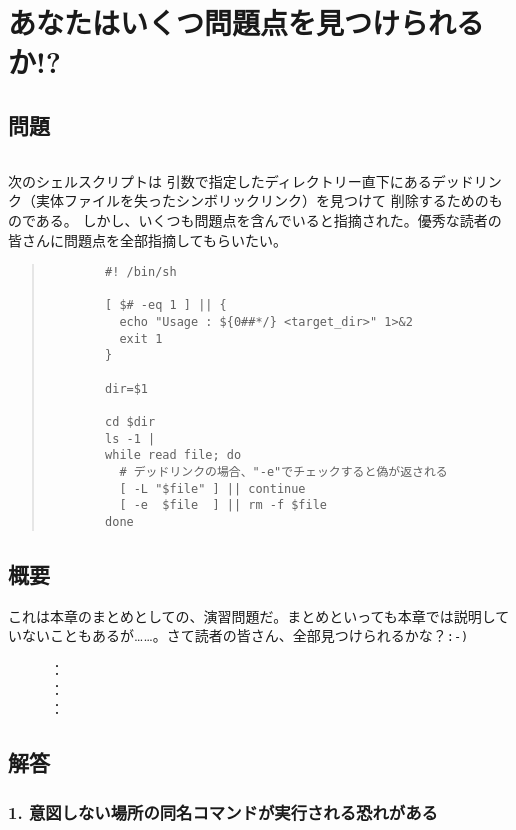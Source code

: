 \section{あなたはいくつ問題点を見つけられるか!?}

\subsection*{問題}
\noindent
$\!\!\!\!\!$
\begin{grshfboxit}{160.0mm}
	次のシェルスクリプトは
	引数で指定したディレクトリー直下にあるデッドリンク（実体ファイルを失ったシンボリックリンク）を見つけて
	削除するためのものである。
	しかし、いくつも問題点を含んでいると指摘された。優秀な読者の皆さんに問題点を全部指摘してもらいたい。
	\begin{quote}
	\begin{frameboxit}{100.0mm}
	\begin{verbatim}
		#! /bin/sh

		[ $# -eq 1 ] || {
		  echo "Usage : ${0##*/} <target_dir>" 1>&2
		  exit 1
		}

		dir=$1

		cd $dir
		ls -1 |
		while read file; do
		  # デッドリンクの場合、"-e"でチェックすると偽が返される
		  [ -L "$file" ] || continue
		  [ -e  $file  ] || rm -f $file
		done
	\end{verbatim}
	\end{frameboxit}
	\end{quote}
\end{grshfboxit}

\subsection*{概要}
これは本章のまとめとしての、演習問題だ。まとめといっても本章では説明していないこともあるが……。さて読者の皆さん、全部見つけられるかな？\verb|:-)|

\noindent
　　　：\\
　　　：\\
　　　：\\

\subsection*{解答}

\subsubsection*{1. 意図しない場所の同名コマンドが実行される恐れがある}

